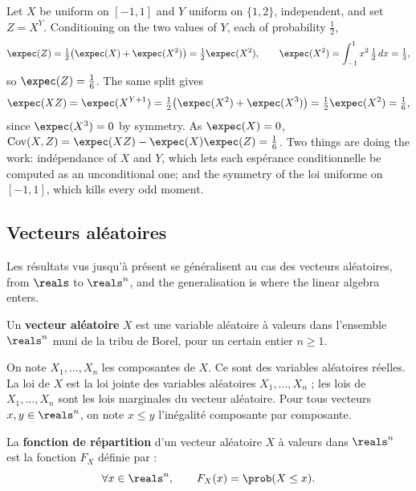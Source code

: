 \begin{example}
  Let $X$ be uniform on $[-1,1]$ and $Y$ uniform on $\{1,2\}$, independent, and
  set $Z = X^{Y}$. Conditioning on the two values of $Y$, each of probability
  $\tfrac12$,
  \[
    \expec(Z) = \tfrac12\big(\expec(X) + \expec(X^{2})\big) = \tfrac12\expec(X^{2}),
    \qquad
    \expec(X^{2}) = \int_{-1}^{1} x^{2}\,\tfrac12\,dx = \tfrac13 ,
  \]
  so $\expec(Z) = \tfrac16$. The same split gives
  \[
    \expec(XZ) = \expec(X^{Y+1})
      = \tfrac12\big(\expec(X^{2}) + \expec(X^{3})\big)
      = \tfrac12 \expec(X^{2}) = \tfrac16 ,
  \]
  since $\expec(X^{3})=0$ by symmetry. As $\expec(X)=0$,
  $\Cov(X,Z) = \expec(XZ) - \expec(X)\expec(Z) = \tfrac16$. Two things are doing
  the work: indépendance of $X$ and $Y$, which lets each espérance conditionnelle
  be computed as an unconditional one; and the symmetry of the loi uniforme on
  $[-1,1]$, which kills every odd moment.
\end{example}

\subsection{Vecteurs aléatoires}

Les résultats vus jusqu'à présent se généralisent au cas des vecteurs aléatoires,
from $\reals$ to $\reals^{n}$, and the generalisation is where the linear algebra
enters.

\begin{definition}
  Un \textbf{vecteur aléatoire} $X$ est une variable aléatoire à valeurs dans
  l'ensemble $\reals^{n}$ muni de la tribu de Borel, pour un certain entier
  $n \geq 1$.
\end{definition}

On note $X_{1},\dots,X_{n}$ les composantes de $X$. Ce sont des variables
aléatoires réelles. La loi de $X$ est la loi jointe des variables aléatoires
$X_{1},\dots,X_{n}$ ; les lois de $X_{1},\dots,X_{n}$ sont les lois marginales du
vecteur aléatoire. Pour tous vecteurs $x,y \in \reals^{n}$, on note $x \leq y$
l'inégalité composante par composante.

\begin{definition}
  La \textbf{fonction de répartition} d'un vecteur aléatoire $X$ à valeurs dans
  $\reals^{n}$ est la fonction $F_{X}$ définie par :
  \[
    \forall x \in \reals^{n}, \qquad F_{X}(x) = \prob(X \leq x).
  \]
\end{definition}

